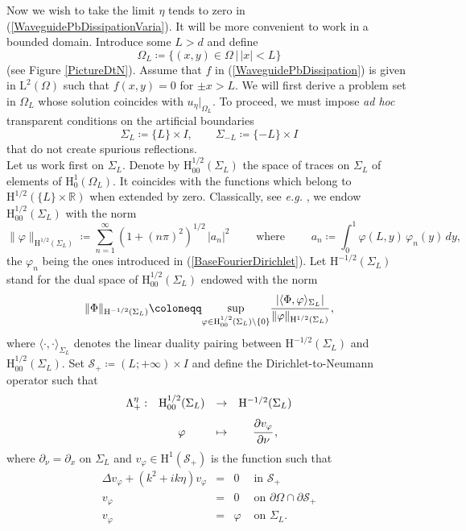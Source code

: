 \documentclass[11pt,a4paper]{report}
\newcommand{\Om}{\Omega}
\newcommand{\mrm}[1]{\mathrm{#1}}
\newcommand{\R}{\mathbb{R}}
\newcommand{\mL}{\mrm{L}}
\newcommand{\mH}{\mrm{H}}
\begin{document}
\noindent Now we wish to take the limit $\eta$ tends to zero in (\ref{WaveguidePbDissipationVaria}). It will be more convenient to work in a bounded domain. Introduce some $L>d$ and define 
\[
\Om_L\coloneqq\{(x,y)\in\Om\,|\,|x|<L\}
\]
(see Figure \ref{PictureDtN}). Assume that $f$ in (\ref{WaveguidePbDissipation}) is given in $\mL^2(\Om)$ such that $f(x,y)=0$ for $\pm x >L$. We will first derive a problem set in $\Om_L$ whose solution coincides with $u_\eta|_{\Om_L}$. To proceed, we must impose \textit{ad hoc} transparent conditions on the artificial boundaries 
\[
\Sigma_{L}\coloneqq\{L\}\times I,\qquad  \Sigma_{-L}\coloneqq\{-L\}\times I
\]
that do not create spurious reflections.\\
\newline
Let us work first on $\Sigma_L$. Denote by $\mH^{1/2}_{00}(\Sigma_L)$ the space of traces on $\Sigma_L$ of elements of $\mH^1_0(\Om_L)$. It coincides with the functions which belong to $\mH^{1/2}(\{L\}\times \R)$ when extended by zero. Classically, see \textit{e.g.} \cite[\S1.4]{CaCo06}, we endow $\mH^{1/2}_{00}(\Sigma_L)$ with the norm
\[
\|\varphi\|_{\mH^{1/2}(\Sigma_L)}\coloneqq \sum_{n=1}^\infty \left(1+(n\pi)^2\right)^{1/2}\,|a_n|^2\qquad\mbox{ where }\qquad a_n\coloneqq \int_0^1\varphi(L,y)\,\varphi_n(y)\,dy,
\] 
the $\varphi_n$ being the ones introduced in (\ref{BaseFourierDirichlet}). Let $\mH^{-1/2}(\Sigma_L)$ stand for the dual space of $\mH^{1/2}_{00}(\Sigma_L)$ endowed with the norm
\[
\|\Phi\|_{\mH^{-1/2}(\Sigma_L)}\coloneqq\underset{\varphi\in\mH^{1/2}_{00}(\Sigma_L)\setminus\{0\}}{\sup}\cfrac{|\langle \Phi,\varphi\rangle_{\Sigma_L}|}{\|\varphi\|_{\mH^{1/2}(\Sigma_L)}}\,,
\]
where $\langle \cdot,\cdot\rangle_{\Sigma_L}$ denotes the linear duality pairing between $\mH^{-1/2}(\Sigma_{L})$ and $\mH^{1/2}_{00}(\Sigma_{L})$. Set $\mathcal{S}_+\coloneqq(L;+\infty)\times I$ and define the Dirichlet-to-Neumann operator such that
\[
\begin{array}{lccc}
\Lambda_+^\eta:& \mH^{1/2}_{00}(\Sigma_L) & \to& \mH^{-1/2}(\Sigma_L) \\[6pt]
 & \varphi & \mapsto  & \cfrac{\partial v_{\varphi}}{\partial \nu}\,,
\end{array}
\]
where $\partial_\nu=\partial_x$ on $\Sigma_L$ and $v_{\varphi}\in \mH^1(\mathcal{S}_+)$ is the function such that
\begin{equation}\label{PbSP}
\begin{array}{|rcll}
\Delta v_{\varphi}+(k^2+ik\eta)v_{\varphi}&=&0&\mbox{ in }\mathcal{S}_+ \\[2pt]
v_{\varphi}&=&0&\mbox{ on }\partial\Om\cap\partial \mathcal{S}_+\\[2pt]
v_{\varphi}&=&\varphi&\mbox{ on }\Sigma_L.
\end{array}
\end{equation}
\end{document}
